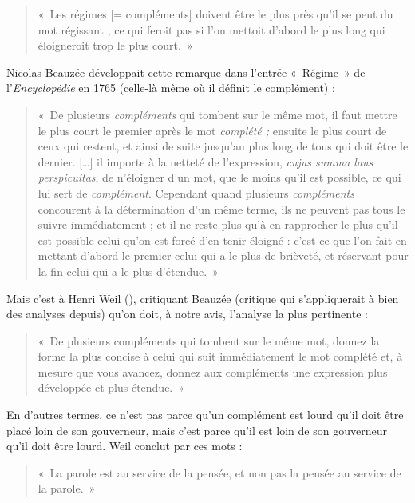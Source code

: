 \begin{quote}
    «~Les régimes [= compléments] doivent être le plus près qu’il se peut du mot régissant ; ce qui feroit pas si l’on mettoit d’abord le plus long qui éloigneroit trop le plus court.~»
\end{quote}
Nicolas Beauzée développait cette remarque dans l’entrée «~Régime~» de l’\textit{Encyclopédie} en 1765 (celle-là même où il définit le complément) :
\begin{quote}
    «~De plusieurs \textit{compléments} qui tombent sur le même mot, il faut mettre le plus court le premier après le mot \textit{complété ;} ensuite le plus court de ceux qui restent, et ainsi de suite jusqu’au plus long de tous qui doit être le dernier. […] il importe à la netteté de l’expression, \textit{\textit{cujus summa laus perspicuitas}}, de n’éloigner d’un mot, que le moins qu’il est possible, ce qui lui sert de \textit{complément}. Cependant quand plusieurs \textit{compléments} concourent à la détermination d’un même terme, ils ne peuvent pas tous le suivre immédiatement ; et il ne reste plus qu’à en rapprocher le plus qu’il est possible celui qu’on est forcé d’en tenir éloigné : c’est ce que l’on fait en mettant d’abord le premier celui qui a le plus de brièveté, et réservant pour la fin celui qui a le plus d’étendue.~»
\end{quote}
Mais c’est à Henri Weil (\citeyear[97--102]{weil1844de}), critiquant Beauzée (critique qui s’appliquerait à bien des analyses depuis) qu’on doit, à notre avis, l’analyse la plus pertinente :
\begin{quote}
    «~De plusieurs compléments qui tombent sur le même mot, donnez la forme la plus concise à celui qui suit immédiatement le mot complété et, à mesure que vous avancez, donnez aux compléments une expression plus développée et plus étendue.~»
\end{quote}
En d’autres termes, ce n’est pas parce qu’un complément est lourd qu’il doit être placé loin de son gouverneur, mais c’est parce qu’il est loin de son gouverneur qu’il doit être lourd. Weil conclut par ces mots :
\begin{quote}
    «~La parole est au service de la pensée, et non pas la pensée au service de la parole.~»
\end{quote}
